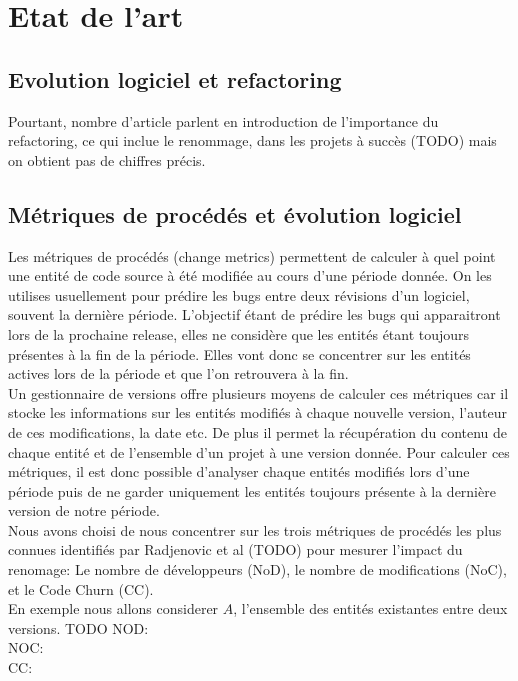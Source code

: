 \section{Etat de l'art}
\label{sec:etat_de_lart}

\subsection{Evolution logiciel et refactoring}
Pourtant, nombre d'article parlent en introduction de l'importance du refactoring, ce qui inclue le renommage, dans les projets à succès (TODO) mais on obtient pas de chiffres précis.\\

\subsection{Métriques de procédés et évolution logiciel}
Les métriques de procédés (change metrics) permettent de calculer à quel point une entité de code source à été modifiée au cours d'une période donnée. On les utilises usuellement pour prédire les bugs entre deux révisions d'un logiciel, souvent la dernière période. L'objectif étant de prédire les bugs qui apparaitront lors de la prochaine release, elles ne considère que les entités étant toujours présentes à la fin de la période. Elles vont donc se concentrer sur les entités actives lors de la période et que l'on retrouvera à la fin.\\
Un gestionnaire de versions offre plusieurs moyens de calculer ces métriques car il stocke les informations sur les entités modifiés à chaque nouvelle version, l'auteur de ces modifications, la date etc. De plus il permet la récupération du contenu de chaque entité et de l'ensemble d'un projet à une version donnée. Pour calculer ces métriques, il est donc possible d'analyser chaque entités modifiés lors d'une période puis de ne garder uniquement les entités toujours présente à la dernière version de notre période.\\
Nous avons choisi de nous concentrer sur les trois métriques de procédés les plus connues identifiés par Radjenovic et al (TODO) pour mesurer l'impact du renomage: Le nombre de développeurs (NoD), le nombre de modifications (NoC), et le Code Churn (CC).\\
En exemple nous allons considerer $A$, l'ensemble des entités existantes entre deux versions.  TODO
NOD:\\
NOC:\\
CC:\\ 

